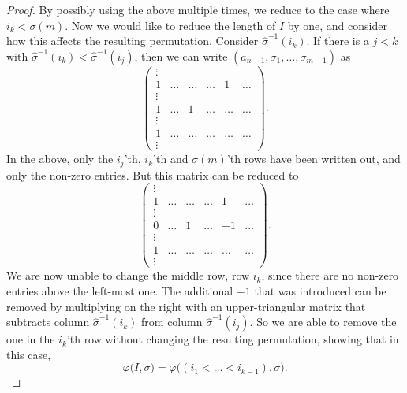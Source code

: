 \begin{proof}
  By possibly using the above multiple times, we reduce to the case
  where $i_k < \sigma(m)$. Now we would like to reduce the length of
  $I$ by one, and consider how this affects the resulting permutation.
  Consider $\widehat\sigma^{-1}(i_k)$. If
  there is a $j < k$ with $\widehat\sigma^{-1}(i_k) <
  \widehat\sigma^{-1}(i_j)$, then we can write
  $(a_{n+1},\sigma_1,\dots,\sigma_{m-1})$ as
  \[
  \begin{pmatrix}
    \vdots & \\
    1 & \dots & \dots & \dots & 1 & \dots\\
    \vdots \\
    1 & \dots & 1 & \dots & \dots & \dots\\
    \vdots & \\
    1 &  \dots & \dots & \dots & \dots & \dots\\
    \vdots
  \end{pmatrix}. \]
  In the above, only the $i_j$'th, $i_k$'th and $\sigma(m)$'th rows
  have been written out, and only the non-zero entries. But this
  matrix can be reduced to
  \[
  \begin{pmatrix}
    \vdots & \\
    1 & \dots & \dots & \dots & 1 & \dots\\
    \vdots \\
    0 & \dots & 1 & \dots & -1 & \dots\\
    \vdots & \\
    1 & \dots & \dots  & \dots & \dots & \dots\\
    \vdots
  \end{pmatrix}. \]
  We are now unable to change the middle row, row $i_k$, since there
  are no non-zero
  entries above the left-most one. The additional $-1$ that was
  introduced can be removed by multiplying on the right with an
  upper-triangular matrix that subtracts column
  $\widehat\sigma^{-1}(i_k)$
  from column $\widehat\sigma^{-1}(i_j)$. So we are able to remove the
  one in the $i_k$'th row without changing the resulting permutation,
  showing that in this case,
  \[ \varphi\big(I,\sigma\big) =
  \varphi\big((i_1<\dots<i_{k-1}),\sigma\big). \]


\end{proof}
